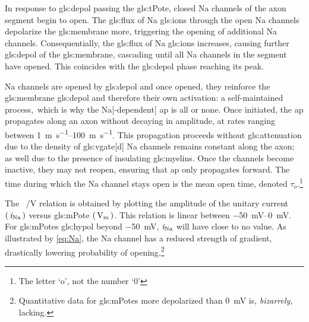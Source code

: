 \documentclass[class={myRUCProject}, crop=false]{standalone}
\begin{document}
In response to \gls{gls:depol} passing the \gls{gls:tPote}, closed \gls{Na} channels of the axon segment begin to open. The \gls{gls:flux} of \gls{Na} \glspl{gls:ion} through the open \gls{Na} channels depolarize the \gls{gls:membrane} more, triggering the opening of additional \gls{Na} channels. 
Consequentially, the \gls{gls:flux} of \gls{Na} \glspl{gls:ion} increases, causing further \gls{gls:depol} of the \gls{gls:membrane}, cascading until all \gls{Na} channels in the segment have opened. 
This coincides with the \gls{gls:depol} phase reaching its peak. 

{}\gls{Na} channels are opened by \gls{gls:depol} and once opened, they reinforce the \gls{gls:membrane} \gls{gls:depol} and therefore their own activation: a self-maintained process,\footnotemark~which is why the \gls{Na}[-dependent] \gls{ap} is all or none.
Once initiated, the \gls{ap} propagates along an axon without decaying in amplitude, at rates ranging between \qtyrange{1}{100}{\meter\per\s}. 
This propagation proceeds without \gls{gls:attenuation} due to the density of \gls{gls:vgate}[d] \gls{Na} channels remains constant along the axon; as well due to the presence of insulating \glspl{gls:myelin}. 
Once the channels become inactive, they may not reopen, ensuring that \gls{ap} only propagates forward. 
The time during which the \gls{Na} channel stays open is the mean open time, denoted \(\tau_o\).\footnote{The letter  `o', not the number `0'}

The \unit[per-mode = symbol]{\ucur\sodium\per\V} relation is obtained by plotting the amplitude of the unitary current \(\left(\,\mathit{i}_\mathrm{Na}\,\right)\) versus \gls{gls:mPote} \(\br{\unit{\V\membrane}}\). This relation is linear between \qtyrange{-50}{0}{\mV}. For \glspl{gls:mPote} \gls{gls:hypol} beyond \qty{-50}{\mV}, \(\mathit{i}_\mathrm{Na}\) will have close to no value. As illustrated by \cref{eq:Na}, the \gls{Na} channel has a reduced strength of gradient, drastically lowering probability of opening.\footnote{Quantitative data for \glspl{gls:mPote} more depolarized than \qty{0}{\mV} is, \emph{bizarrely}, lacking.}
\end{document}
